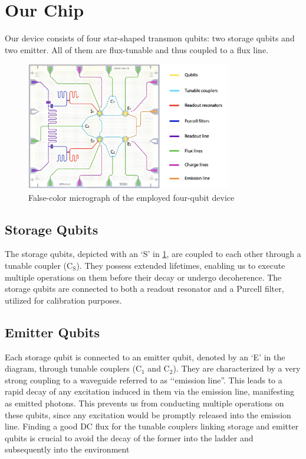 \section{Our Chip}
\label{sec:our_setup}

Our device consists of four star-shaped transmon qubits: two storage qubits and two emitter.
All of them are flux-tunable and thus coupled to a flux line.

\begin{figure}[h]
    \centering
    \includegraphics[width = 0.8\textwidth]{Images/Chap1/our_chip.png}
    \caption{False-color micrograph of the employed four-qubit device}
    \label{fig:our_chip}
\end{figure}

\subsection{Storage Qubits}
The storage qubits, depicted with an ‘S' in \cref{fig:our_chip}, are coupled to each other through a tunable coupler ($\text{C}_\text{S}$).
They possess extended lifetimes, enabling us to execute multiple operations on them before their decay or undergo decoherence.
The storage qubits are connected to both a readout resonator and a Purcell filter, utilized for calibration purposes.

\subsection{Emitter Qubits}
Each storage qubit is connected to an emitter qubit, denoted by an ‘E' in the diagram, through tunable couplers ($\text{C}_1$ and $\text{C}_2$).
They are characterized by a very strong coupling to a waveguide referred to as ‘‘emission line''.
This leads to a rapid decay of any excitation induced in them via the emission line, manifesting as emitted photons.
This prevents us from conducting multiple operations on these qubits, since any excitation would be promptly released into the emission line.
Finding a good DC flux for the tunable couplers linking storage and emitter qubits is crucial to avoid the decay of the former into the ladder and subsequently into the environment
